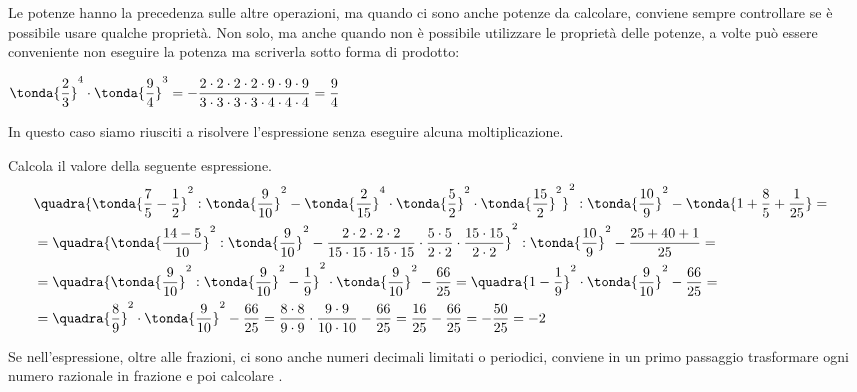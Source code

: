 Le potenze hanno la precedenza sulle altre operazioni, ma quando ci sono 
anche potenze da calcolare, conviene sempre controllare se è possibile usare 
qualche proprietà. Non solo, ma anche quando non è possibile utilizzare le 
proprietà delle potenze, a volte può essere conveniente non eseguire la 
potenza ma scriverla sotto forma di prodotto:

\begin{esempio}{}{}
\(\tonda{\dfrac{2}{3}}^4 \cdot \tonda{\dfrac{9}{4}}^3  = 
-\dfrac{2 \cdot 2 \cdot 2 \cdot 2 \cdot 9 \cdot 9 \cdot 9}
      {3 \cdot 3 \cdot 3 \cdot 3 \cdot 4 \cdot 4 \cdot 4} = \dfrac{9}{4}\)
\end{esempio}

In questo caso siamo riusciti a risolvere l'espressione senza eseguire
alcuna moltiplicazione.


\begin{esempio}{}{}
Calcola il valore della seguente espressione.
{\footnotesize
\begin{align*}
&\quadra{
  \tonda{\frac{7}{5}-\frac{1}{2}}^{2}:
  \tonda{\frac{9}{10}}^{2}-
  \tonda{\frac{2}{15}}^{4} \cdot
  \tonda{\frac{5}{2}}^2 \cdot
  \tonda{\frac{15}{2}}^{2}
}^{2}:
\tonda{\frac{10}{9}}^{2}-
\tonda{1+\frac{8}{5}+\frac{1}{25}}=&\\
&=\quadra{
  \tonda{\frac{14 - 5}{10}}^{2}:
  \tonda{\frac{9}{10}}^{2}-
  \frac{2 \cdot 2 \cdot 2 \cdot 2}{15 \cdot 15 \cdot 15 \cdot 15} \cdot
  \frac{5 \cdot 5}{2 \cdot 2} \cdot
  \frac{15 \cdot 15}{2 \cdot 2}
}^{2}:
\tonda{\frac{10}{9}}^{2}-
\frac{25 + 40 + 1}{25}=\\
&=\quadra{
  \tonda{\frac{9}{10}}^{2}:
  \tonda{\frac{9}{10}}^{2}-
  \frac{1}{9}
}^{2} \cdot
\tonda{\frac{9}{10}}^{2}-
\frac{66}{25}=
\quadra{
  1 -\frac{1}{9}
}^{2} \cdot
\tonda{\frac{9}{10}}^{2}-
\frac{66}{25}=\\
&=\quadra{\frac{8}{9}}^{2} \cdot
\tonda{\frac{9}{10}}^{2}-
\frac{66}{25}=
\frac{8\cdot8}{9 \cdot 9} \cdot
\frac{9\cdot9}{10 \cdot 10}-
\frac{66}{25} = \frac{16}{25} - \frac{66}{25} = -\frac{50}{25} = -2
\end{align*}
}
\end{esempio}

Se nell'espressione, oltre alle frazioni, ci sono anche numeri decimali 
limitati o periodici, conviene in un primo passaggio trasformare ogni 
numero razionale in frazione e poi calcolare
.

